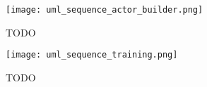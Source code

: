 \begin{figure}[h]
    \begin{adjustwidth}{-0.2\paperwidth}{-0.2\paperwidth}
        \centering
        \texttt{[image: uml\_sequence\_actor\_builder.png]}
        \caption{TODO}
        \label{fig:uml_sequence_builder}
    \end{adjustwidth}
\end{figure}

\begin{figure}[h]
    \begin{adjustwidth}{-0.2\paperwidth}{-0.2\paperwidth}
        \centering
        \texttt{[image: uml\_sequence\_training.png]}
        \caption{TODO}
        \label{fig:uml_sequence_training}
    \end{adjustwidth}
\end{figure}